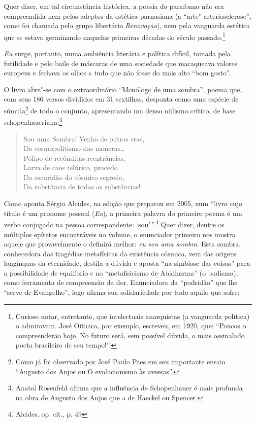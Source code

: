 Quer dizer, em tal circunstância histórica, a poesia do paraibano
não era compreendida nem pelos adeptos da estética parnasiana (a
“arte"-arteriosclerose”, como foi chamada pelo grupo libertário
\textit{Renovação}), nem pela vanguarda estética que se estava
germinando naquelas primeiras décadas do século passado.\footnote{
Curioso notar, entretanto, que intelectuais anarquistas (a vanguarda
política) o admiravam. José Oiticica, por exemplo, escreveu, em 1920,
que: “Poucos o compreenderão hoje. No futuro será, sem possível dúvida,
o mais assinalado poeta brasileiro de seu tempo!”.}

\textit{Eu} surge, portanto, numa ambiência literária e política
difícil, tomada pela futilidade e pelo baile de máscaras de uma
sociedade que macaqueava valores europeus e fechava os olhos a tudo que
não fosse do mais alto “bom gosto”.

O livro abre"-se com o extraordinário “Monólogo de uma sombra”, poema
que, com seus 186 versos divididos em 31 sextilhas, desponta como uma
espécie de súmula\footnote{ Como já foi observado por José Paulo Paes em seu
importante ensaio “Augusto dos Anjos ou O evolucionismo às avessas”.} de
todo o conjunto, apresentando um denso niilismo crítico, de base
schopenhaueriana:\footnote{ Anatol Rosenfeld afirma 
que a influência de Schopenhauer é mais profunda na obra de
Augusto dos Anjos que a de Haeckel ou Spencer.}

\begin{verse}
Sou uma Sombra! Venho de outras eras,\\
Do cosmopolitismo das moneras\ldots{}\\
Pólipo de recônditas reentrâncias,\\
Larva de caos telúrico, procedo\\
Da escuridão do cósmico segredo,\\
Da substância de todas as substâncias!
\end{verse}

Como aponta Sérgio Alcides, na edição que preparou em 2005, num
“livro cujo título é um pronome pessoal (\textit{Eu}), a primeira
palavra do primeiro poema é um verbo conjugado na pessoa
correspondente: ‘sou’\,”.\footnote{Alcides, op. cit., p. 49} Quer dizer, dentre os
múltiplos epítetos encontráveis no volume, o enunciador primeiro nos
mostra aquele que provavelmente o definirá melhor: \textit{eu sou uma
sombra}. Esta sombra, conhecedora das tragédias metafísicas da existência cósmica, 
vem das origens longínquas da eternidade, destila a
dúvida e aposta “na simbiose das coisas” para a possibilidade de
equilíbrio e no “metafisicismo de Abidharma” (o budismo), como
ferramenta de compreensão da dor. Enunciadora da “podridão” que lhe
“serve de Evangelho”, logo afirma sua solidariedade por tudo aquilo que
sofre:

